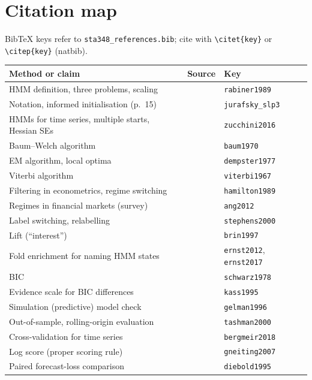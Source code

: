 \documentclass[11pt]{article}
\begin{document}
\section{Citation map}\label{sec:citemap}
BibTeX keys refer to \texttt{sta348\_references.bib}; cite with \verb|\citet{key}| or \verb|\citep{key}| (natbib).
{\small
\begin{longtable}{@{}p{6.3cm}p{5.2cm}p{3.6cm}@{}}
\toprule
Method or claim & Source & Key \\
\midrule
\endhead
HMM definition, three problems, scaling & \citet{rabiner1989} & \texttt{rabiner1989} \\
Notation, informed initialisation (p.~15) & \citet{jurafsky_slp3} & \texttt{jurafsky\_slp3} \\
HMMs for time series, multiple starts, Hessian SEs & \citet{zucchini2016} & \texttt{zucchini2016} \\
Baum--Welch algorithm & \citet{baum1970} & \texttt{baum1970} \\
EM algorithm, local optima & \citet{dempster1977} & \texttt{dempster1977} \\
Viterbi algorithm & \citet{viterbi1967} & \texttt{viterbi1967} \\
Filtering in econometrics, regime switching & \citet{hamilton1989} & \texttt{hamilton1989} \\
Regimes in financial markets (survey) & \citet{ang2012} & \texttt{ang2012} \\
Label switching, relabelling & \citet{stephens2000} & \texttt{stephens2000} \\
Lift (``interest'') & \citet{brin1997} & \texttt{brin1997} \\
Fold enrichment for naming HMM states & \citet{ernst2012,ernst2017} & \texttt{ernst2012}, \texttt{ernst2017} \\
BIC & \citet{schwarz1978} & \texttt{schwarz1978} \\
Evidence scale for BIC differences & \citet{kass1995} & \texttt{kass1995} \\
Simulation (predictive) model check & \citet{gelman1996} & \texttt{gelman1996} \\
Out-of-sample, rolling-origin evaluation & \citet{tashman2000} & \texttt{tashman2000} \\
Cross-validation for time series & \citet{bergmeir2018} & \texttt{bergmeir2018} \\
Log score (proper scoring rule) & \citet{gneiting2007} & \texttt{gneiting2007} \\
Paired forecast-loss comparison & \citet{diebold1995} & \texttt{diebold1995} \\

\end{longtable}}
\end{document}
